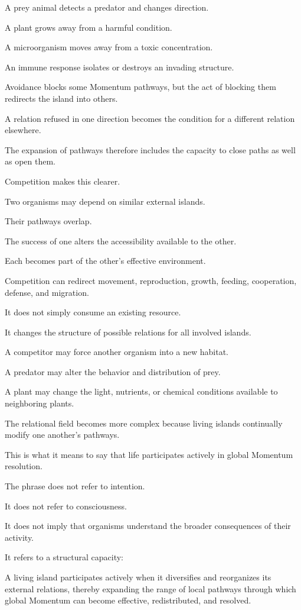 A prey animal detects a predator and changes direction.

A plant grows away from a harmful condition.

A microorganism moves away from a toxic concentration.

An immune response isolates or destroys an invading structure.

Avoidance blocks some Momentum pathways, but the act of blocking them redirects the island into others.

A relation refused in one direction becomes the condition for a different relation elsewhere.

The expansion of pathways therefore includes the capacity to close paths as well as open them.

Competition makes this clearer.

Two organisms may depend on similar external islands.

Their pathways overlap.

The success of one alters the accessibility available to the other.

Each becomes part of the other’s effective environment.

Competition can redirect movement, reproduction, growth, feeding, cooperation, defense, and migration.

It does not simply consume an existing resource.

It changes the structure of possible relations for all involved islands.

A competitor may force another organism into a new habitat.

A predator may alter the behavior and distribution of prey.

A plant may change the light, nutrients, or chemical conditions available to neighboring plants.

The relational field becomes more complex because living islands continually modify one another’s pathways.

This is what it means to say that life participates actively in global Momentum resolution.

The phrase does not refer to intention.

It does not refer to consciousness.

It does not imply that organisms understand the broader consequences of their activity.

It refers to a structural capacity:

A living island participates actively when it diversifies and reorganizes its external relations, thereby expanding the range of local pathways through which global Momentum can become effective, redistributed, and resolved.


